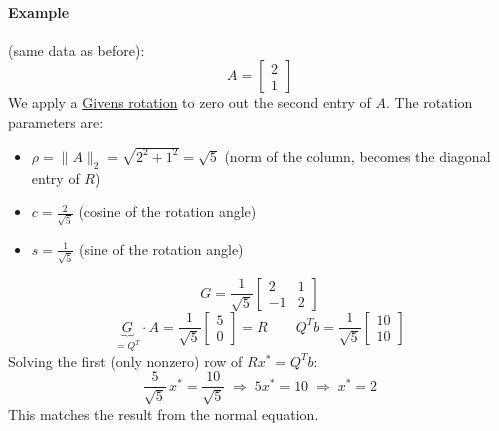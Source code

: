 \documentclass{article}
\begin{document}
\paragraph{Example} (same data as before):
\[
  A = \begin{bmatrix} 2 \\ 1 \end{bmatrix}
\]
We apply a \hyperref[sec:givens]{Givens rotation} to zero out the second entry of $A$.
The rotation parameters are:
\begin{itemize}
  \item $\rho = \|A\|_2 = \sqrt{2^2 + 1^2} = \sqrt{5}$ \quad (norm of the column,
        becomes the diagonal entry of $R$)
  \item $c = \tfrac{2}{\sqrt{5}}$ \quad (cosine of the rotation angle)
  \item $s = \tfrac{1}{\sqrt{5}}$ \quad (sine of the rotation angle)
\end{itemize}
\[
  G = \frac{1}{\sqrt{5}}\begin{bmatrix} 2 & 1 \\ -1 & 2 \end{bmatrix}
\]
\[
  \underbrace{G}_{=Q^T} \cdot A
  = \frac{1}{\sqrt{5}}\begin{bmatrix} 5 \\ 0 \end{bmatrix} = R
  \qquad
  Q^Tb = \frac{1}{\sqrt{5}}\begin{bmatrix} 10 \\ 10 \end{bmatrix}
\]
Solving the first (only nonzero) row of $Rx^* = Q^Tb$:
\[
  \frac{5}{\sqrt{5}}\, x^* = \frac{10}{\sqrt{5}}
  \;\Longrightarrow\; 5x^* = 10
  \;\Longrightarrow\; x^* = 2
\]
This matches the result from the normal equation.
\end{document}
